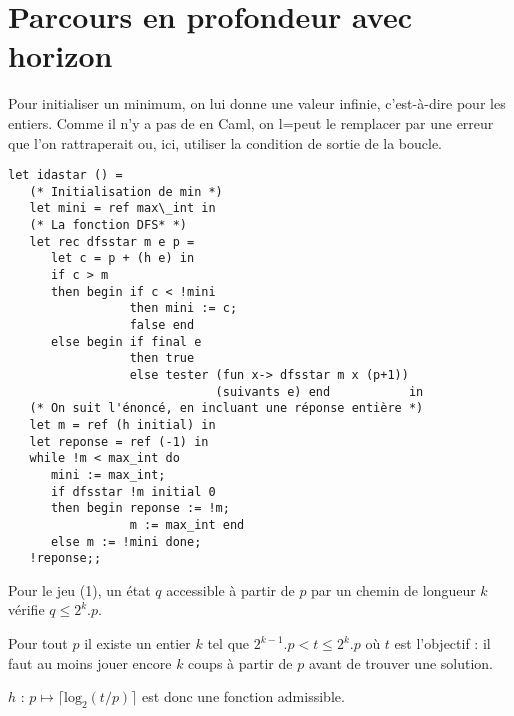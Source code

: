 \section{Parcours en profondeur avec horizon}
\begin{Exercise} 
Pour initialiser un minimum, on lui donne une valeur infinie, c'est-à-dire  pour les entiers. Comme il n'y a pas de  en Caml, on l=peut le remplacer par une erreur que l'on rattraperait ou, ici, utiliser la condition de sortie de la boucle.
\begin{lstlisting} 
let idastar () = 
   (* Initialisation de min *)
   let mini = ref max\_int in
   (* La fonction DFS* *)
   let rec dfsstar m e p = 
      let c = p + (h e) in
      if c > m 
      then begin if c < !mini 
                 then mini := c; 
                 false end
      else begin if final e 
                 then true
                 else tester (fun x-> dfsstar m x (p+1)) 
                             (suivants e) end           in
   (* On suit l'énoncé, en incluant une réponse entière *)
   let m = ref (h initial) in
   let reponse = ref (-1) in
   while !m < max_int do
      mini := max_int;
      if dfsstar !m initial 0
      then begin reponse := !m;
                 m := max_int end
      else m := !mini done;
   !reponse;; 
\end{lstlisting} 
\end{Exercise}
\newpage 
\begin{Exercise} 
Pour le jeu (1), un état $q$ accessible à partir de $p$ par un chemin de longueur $k$ vérifie $q\le 2^k.p$. 

Pour tout $p$ il existe un entier $k$ tel que $2^{k-1}.p < t \le 2^k.p$ où $t$ est l'objectif : il faut au moins jouer encore $k$ coups à partir de $p$ avant de trouver une solution. 

$h$ : $p \mapsto \lceil \text{log}_2(t/p)\rceil$ est donc une fonction admissible.
\end{Exercise}
